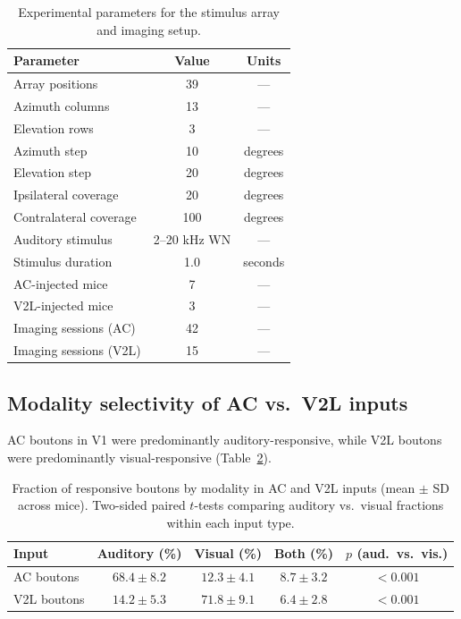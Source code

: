 \documentclass[11pt]{article}
\begin{document}
\begin{table}[H]
\centering
\caption{Experimental parameters for the stimulus array and imaging setup.}
\label{tab:setup}
\begin{tabular}{lcc}
\toprule
\textbf{Parameter} & \textbf{Value} & \textbf{Units} \\
\midrule
Array positions & 39 & --- \\
Azimuth columns & 13 & --- \\
Elevation rows & 3 & --- \\
Azimuth step & 10 & degrees \\
Elevation step & 20 & degrees \\
Ipsilateral coverage & 20 & degrees \\
Contralateral coverage & 100 & degrees \\
Auditory stimulus & 2--20 kHz WN & --- \\
Stimulus duration & 1.0 & seconds \\
AC-injected mice & 7 & --- \\
V2L-injected mice & 3 & --- \\
Imaging sessions (AC) & 42 & --- \\
Imaging sessions (V2L) & 15 & --- \\
\bottomrule
\end{tabular}
\end{table}

\subsection{Modality selectivity of AC vs.\ V2L inputs}

AC boutons in V1 were predominantly auditory-responsive, while V2L boutons were predominantly visual-responsive (Table~\ref{tab:modality}).

\begin{table}[H]
\centering
\caption{Fraction of responsive boutons by modality in AC and V2L inputs (mean $\pm$ SD across mice). Two-sided paired $t$-tests comparing auditory vs.\ visual fractions within each input type.}
\label{tab:modality}
\begin{tabular}{lcccc}
\toprule
\textbf{Input} & \textbf{Auditory (\%)} & \textbf{Visual (\%)} & \textbf{Both (\%)} & \textbf{$p$ (aud.\ vs.\ vis.)} \\
\midrule
AC boutons & $68.4 \pm 8.2$ & $12.3 \pm 4.1$ & $8.7 \pm 3.2$ & $< 0.001$ \\
V2L boutons & $14.2 \pm 5.3$ & $71.8 \pm 9.1$ & $6.4 \pm 2.8$ & $< 0.001$ \\
\bottomrule
\end{tabular}
\end{table}
\end{document}
